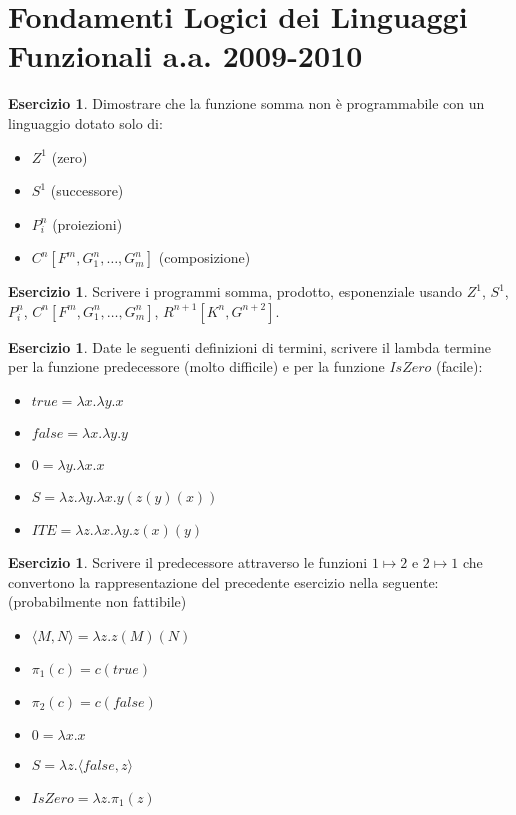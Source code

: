 \documentclass[oneside]{amsart}
\numberwithin{equation}{section}
\numberwithin{figure}{section}
\theoremstyle{plain}
\theoremstyle{definition}
\newtheorem{xca}[thm]{Esercizio}
\begin{document}
\section*{Fondamenti Logici dei Linguaggi Funzionali a.a. 2009-2010}

\begin{xca}
Dimostrare che la funzione somma non è programmabile con un linguaggio dotato solo di:
\begin{itemize}
\item $Z^{1}$ (zero)
\item $S^{1}$ (successore)
\item $P_{i}^{n}$ (proiezioni)
\item $C^{n}[F^{m}, G_{1}^{n}, \ldots, G_{m}^{n}]$ (composizione)
\end{itemize}
\end{xca}

\begin{xca}
Scrivere i programmi somma, prodotto, esponenziale usando $Z^{1}$, $S^{1}$, $P_{i}^{n}$,
$C^{n}[F^{m}, G_{1}^{n}, \ldots, G_{m}^{n}]$, $R^{n+1}[K^{n}, G^{n+2}]$.
\end{xca}

\begin{xca}
Date le seguenti definizioni di termini, scrivere il lambda termine
per la funzione predecessore (molto difficile) e per la funzione $IsZero$ (facile):
\begin{itemize}
\item $true = \lambda x.\lambda y.x $
\item $false = \lambda x.\lambda y.y $
\item $0 = \lambda y.\lambda x.x $
\item $S = \lambda z.\lambda y.\lambda x.y(z(y)(x)) $
\item $ITE = \lambda z.\lambda x.\lambda y.z(x)(y)$
\end{itemize}
\end{xca}

\begin{xca}
Scrivere il predecessore attraverso le funzioni $1 \mapsto 2$ e $2 \mapsto 1$ che
convertono la rappresentazione del precedente esercizio nella seguente: (probabilmente
non fattibile)
\begin{itemize}
\item $\langle M,N\rangle={\lambda}z.z(M)(N)$
\item $\pi_{1}(c)=c(true)$
\item $\pi_{2}(c)=c(false)$
\item $0={\lambda}x.x$
\item $S={\lambda}z.\langle false,z\rangle$
\item $IsZero={\lambda}z.\pi_{1}(z)$
\end{itemize}
\end{xca}
\end{document}
